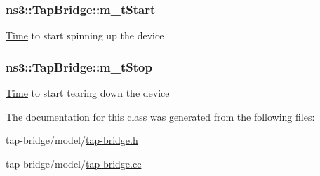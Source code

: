 \subsubsection[{\texorpdfstring{m\+\_\+t\+Start}{m_tStart}}]{ ns3\+::\+Tap\+Bridge\+::m\+\_\+t\+Start\hspace{0.3cm}{\ttfamily [private]}}\hypertarget{classns3_1_1TapBridge_ad6cde3114d24223d3edf0270ce4af231}{}\label{classns3_1_1TapBridge_ad6cde3114d24223d3edf0270ce4af231}
\hyperlink{classns3_1_1Time}{Time} to start spinning up the device 
\subsubsection[{\texorpdfstring{m\+\_\+t\+Stop}{m_tStop}}]{ ns3\+::\+Tap\+Bridge\+::m\+\_\+t\+Stop\hspace{0.3cm}{\ttfamily [private]}}\hypertarget{classns3_1_1TapBridge_ae91102625b83c3b447f48d1798041ab8}{}\label{classns3_1_1TapBridge_ae91102625b83c3b447f48d1798041ab8}
\hyperlink{classns3_1_1Time}{Time} to start tearing down the device 

The documentation for this class was generated from the following files\+:\begin{DoxyCompactItemize}
\item 
tap-\/bridge/model/\hyperlink{tap-bridge_8h}{tap-\/bridge.\+h}\item 
tap-\/bridge/model/\hyperlink{tap-bridge_8cc}{tap-\/bridge.\+cc}\end{DoxyCompactItemize}
